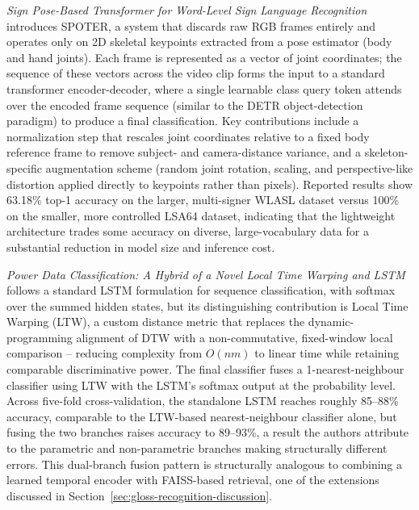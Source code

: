 \emph{Sign Pose-Based Transformer for Word-Level Sign Language Recognition}
\cite{bohacek2022spoter} introduces SPOTER, a system that discards raw RGB frames
entirely and operates only on 2D skeletal keypoints extracted from a pose
estimator (body and hand joints). Each frame is represented as a vector of joint
coordinates; the sequence of these vectors across the video clip forms the input
to a standard transformer encoder-decoder, where a single learnable class query
token attends over the encoded frame sequence (similar to the DETR
object-detection paradigm) to produce a final classification. Key contributions
include a normalization step that rescales joint coordinates relative to a fixed
body reference frame to remove subject- and camera-distance variance, and a
skeleton-specific augmentation scheme (random joint rotation, scaling, and
perspective-like distortion applied directly to keypoints rather than pixels).
Reported results show 63.18\% top-1 accuracy on the larger, multi-signer WLASL
dataset versus 100\% on the smaller, more controlled LSA64 dataset, indicating
that the lightweight architecture trades some accuracy on diverse, large-vocabulary
data for a substantial reduction in model size and inference cost.

\emph{Power Data Classification: A Hybrid of a Novel Local Time Warping and LSTM}
\cite{li2016ltwlstm} follows a standard LSTM formulation for sequence
classification, with softmax over the summed hidden states, but its distinguishing
contribution is Local Time Warping (LTW), a custom distance metric that replaces
the dynamic-programming alignment of DTW with a non-commutative, fixed-window
local comparison -- reducing complexity from $O(nm)$ to linear time while
retaining comparable discriminative power. The final classifier fuses a
1-nearest-neighbour classifier using LTW with the LSTM's softmax output at the
probability level. Across five-fold cross-validation, the standalone LSTM reaches
roughly 85--88\% accuracy, comparable to the LTW-based nearest-neighbour classifier
alone, but fusing the two branches raises accuracy to 89--93\%, a result the
authors attribute to the parametric and non-parametric branches making
structurally different errors. This dual-branch fusion pattern is structurally
analogous to combining a learned temporal encoder with FAISS-based retrieval, one
of the extensions discussed in Section~\ref{sec:gloss-recognition-discussion}.

